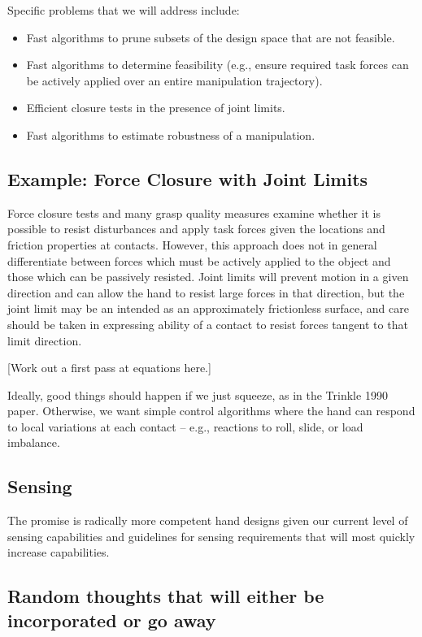 Specific problems that we will address include:
\begin{itemize}
  \item  Fast algorithms to prune subsets of the design space that are not feasible.
  \item Fast algorithms to determine feasibility (e.g., ensure required task forces can be actively applied over an entire manipulation trajectory).
  \item Efficient closure tests in the presence of joint limits.
  \item Fast algorithms to estimate robustness of a manipulation.
\end{itemize}

\subsection{Example:  Force Closure with Joint Limits}

Force closure tests and many grasp quality measures examine whether it is possible to resist disturbances and apply task forces given the locations and friction properties at contacts.    However, this approach does not in general differentiate between forces which must be actively applied to the object and those which can be passively resisted.    Joint limits will prevent motion in a given direction and can allow the hand to resist large forces in that direction, but the joint limit may be an intended as an approximately frictionless surface, and care should be taken in expressing ability of a contact to resist forces tangent to that limit direction.

[Work out a first pass at equations here.]
  
Ideally, good things should happen if we just squeeze, as in the Trinkle 1990 paper.
Otherwise, we want simple control algorithms where the hand can respond to local variations at each contact -- e.g., reactions to roll, slide, or load imbalance.
	
	
\subsection{Sensing}

The promise is radically more competent hand designs given our current level of sensing capabilities and guidelines for sensing requirements that will most quickly increase capabilities.



\subsection{Random thoughts that will either be incorporated or go away}
	
